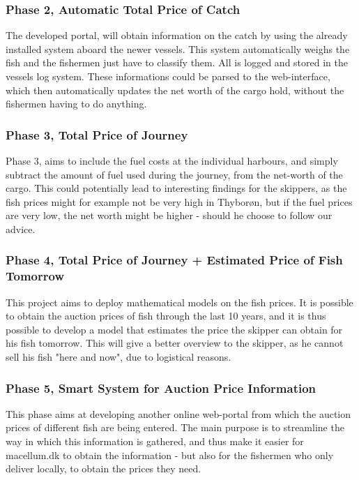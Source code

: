 \documentclass[a4paper,10pt,dateno,oneside,fleqn,sigleft]{newlfm} %
\begin{document}
\begin{newlfm}
\subsubsection{Phase 2, Automatic Total Price of Catch}
The developed portal, will obtain information on the catch by using the already installed system aboard the newer vessels. This system automatically weighs the fish and the fishermen just have to classify them. All is logged and stored in the vessels log system. These informations could be parsed to the web-interface, which then automatically updates the net worth of the cargo hold, without the fishermen having to do anything. 

\subsubsection{Phase 3, Total Price of Journey}
Phase 3, aims to include the fuel costs at the individual harbours, and simply subtract the amount of fuel used during the journey, from the net-worth of the cargo. This could potentially lead to interesting findings for the skippers, as the fish prices might for example not be very high in Thyborøn, but if the fuel prices are very low, the net worth might be higher - should he choose to follow our advice. 

\subsubsection{Phase 4, Total Price of Journey + Estimated Price of Fish Tomorrow}
This project aims to deploy mathematical models on the fish prices. It is possible to obtain the auction prices of fish through the last 10 years, and it is thus possible to develop a model that estimates the price the skipper can obtain for his fish tomorrow. This will give a better overview to the skipper, as he cannot sell his fish "here and now", due to logistical reasons. 

\subsubsection{Phase 5, Smart System for Auction Price Information}
This phase aims at developing another online web-portal from which the auction prices of different fish are being entered. The main purpose is to streamline the way in which this information is gathered, and thus make it easier for macellum.dk to obtain the information - but also for the fishermen who only deliver locally, to obtain the prices they need. 



\end{newlfm}
\end{document}
